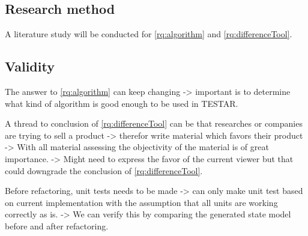         
    

    \subsection{Research method}
    
        A literature study will be conducted for \ref{rq:algorithm} and \ref{rq:differenceTool}. 
        
        
    \subsection{Validity}
    
        The answer to \ref{rq:algorithm} can keep changing -> important is to determine what kind of algorithm is good enough to be used in TESTAR.
        
        A thread to conclusion of \ref{rq:differenceTool} can be that researches or companies are trying to sell a product -> therefor write material which favors their product -> With all material assessing the objectivity of the material is of great importance. -> Might need to express the favor of the current viewer \cite{thesisMulders} but that could downgrade the conclusion of \ref{rq:differenceTool}. 
        
        Before refactoring, unit tests needs to be made -> can only  make unit test based on current implementation with the assumption that all units are working correctly as is. -> We can verify this by comparing the generated state model before and after refactoring.